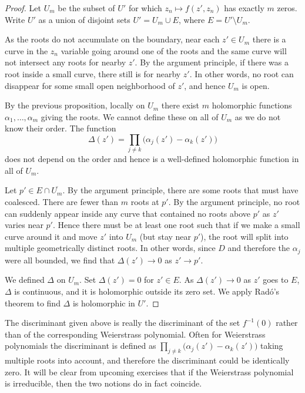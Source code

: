 \documentclass[12pt,openany]{book}
\theoremstyle{plain}
\theoremstyle{remark}
\theoremstyle{definition}
\theoremstyle{exercise}
\theoremstyle{example}
\begin{document}
\begin{proof}
Let $U_m$ be the subset of $U'$ for which $z_n \mapsto f(z',z_n)$
has exactly $m$ zeros.  Write $U'$ 
as a union of disjoint sets $U' = U_m \cup E$, where $E = U' \setminus U_m$.

As the roots do not accumulate on the boundary, near each $z' \in U_m$ there is a
curve in the $z_n$ variable going around one of the roots and the same curve
will not intersect any roots for nearby $z'$.
By the argument principle, if there was a root 
inside a small curve, there still is for nearby $z'$.  In other words, no
root can disappear for some small open neighborhood of $z'$, and hence $U_m$ is open.

By the previous
proposition, locally on $U_m$ there exist $m$ holomorphic functions
$\alpha_1, \ldots, \alpha_m$ giving the roots.  We cannot define
these on all of $U_m$ as we do not know their order.  The function
\begin{equation*}
\Delta(z') = \prod_{j \not= k} \bigl( \alpha_j(z') - \alpha_k(z') \bigr) 
\end{equation*}
does not depend on the order and hence is a well-defined holomorphic
function in all of $U_m$.

Let $p' \in E \cap \overline{U_m}$.
By the argument principle, there are some roots
that must have coalesced.  There are fewer than $m$ roots at $p'$.  By the
argument principle, no root
can suddenly appear inside any curve that contained no roots above $p'$ as $z'$
varies near $p'$.  Hence there must be at least one root such that if we
make a small curve around it and move $z'$ into $U_m$ (but stay near $p'$),
the root will split into multiple geometrically distinct roots.
In other words, since $D$ and therefore the $\alpha_j$ were all bounded, we
find that $\Delta(z') \to 0$ as $z' \to p'$.

We defined $\Delta$ on $U_m$.  Set $\Delta(z') = 0$ for $z' \in E$.
As $\Delta(z') \to 0$ as $z'$ goes to $E$, $\Delta$ is continuous,
and it is holomorphic outside its zero set.  We apply Rad{\'o}'s theorem to find $\Delta$
is holomorphic in $U'$.
\end{proof}

The discriminant given above is really the discriminant of the set
$f^{-1}(0)$ rather than of the corresponding Weierstrass polynomial.  Often
for Weierstrass polynomials the discriminant is defined as 
$\prod_{j \not= k} \bigl( \alpha_j(z') - \alpha_k(z') \bigr)$ taking
multiple roots into account, and therefore the discriminant could be
identically zero.  It will be clear from upcoming exercises that if
the Weierstrass polynomial is irreducible, then the two notions do in fact
coincide.
\end{document}
